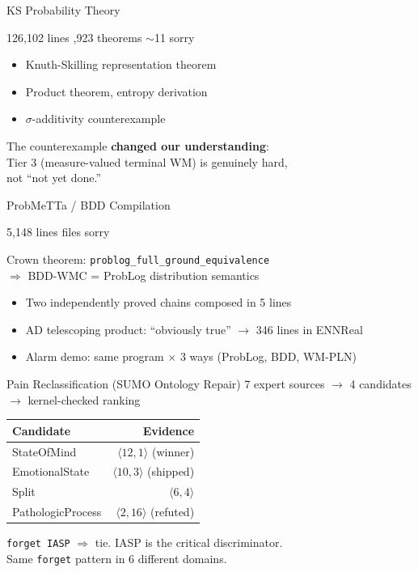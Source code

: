 \documentclass[aspectratio=169,11pt]{beamer}
\begin{document}

\begin{frame}{KS Probability Theory}
\begin{center}
\Large 126,102 lines ,923 theorems \quad $\sim$11 sorry
\end{center}

\bigskip
\begin{itemize}
\item Knuth-Skilling representation theorem
\item Product theorem, entropy derivation
\item $\sigma$-additivity \alert{counterexample}
\end{itemize}

\bigskip
The counterexample \textbf{changed our understanding}:\\
Tier 3 (measure-valued terminal WM) is genuinely hard,\\
not ``not yet done.''
\end{frame}

\begin{frame}{ProbMeTTa / BDD Compilation}
\begin{center}
\Large 5,148 lines  files  sorry
\end{center}

\bigskip
Crown theorem: \texttt{problog\_full\_ground\_equivalence}\\
$\Rightarrow$ BDD-WMC = ProbLog distribution semantics

\bigskip
\begin{itemize}
\item Two independently proved chains composed in \alert{5 lines}
\item AD telescoping product: ``obviously true'' $\to$ 346 lines in ENNReal
\item Alarm demo: same program $\times$ 3 ways (ProbLog, BDD, WM-PLN)
\end{itemize}
\end{frame}

\begin{frame}{Pain Reclassification (SUMO Ontology Repair)}
7 expert sources $\to$ 4 candidates $\to$ kernel-checked ranking

\bigskip
\begin{tabular}{lr}
\toprule
Candidate & Evidence \\
\midrule
\alert{StateOfMind} & $\langle 12, 1 \rangle$ (winner) \\
EmotionalState & $\langle 10, 3 \rangle$ (shipped) \\
Split & $\langle 6, 4 \rangle$ \\
PathologicProcess & $\langle 2, 16 \rangle$ (refuted) \\
\bottomrule
\end{tabular}

\bigskip
\texttt{forget IASP} $\Rightarrow$ tie. IASP is the critical discriminator.\\
Same \texttt{forget} pattern in \alert{6 different domains}.
\end{frame}
\end{document}
